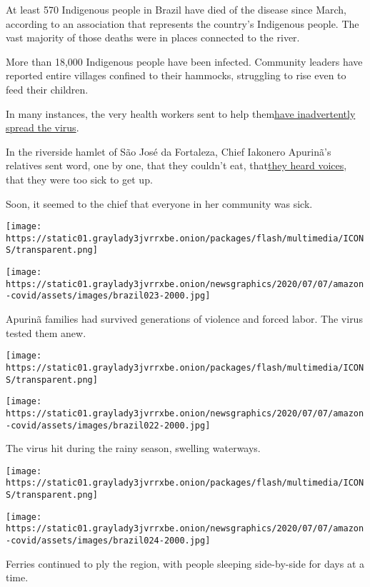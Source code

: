 At least 570 Indigenous people in Brazil have died of the disease since
March, according to an association that represents the country's
Indigenous people. The vast majority of those deaths were in places
connected to the river.

More than 18,000 Indigenous people have been infected. Community leaders
have reported entire villages confined to their hammocks, struggling to
rise even to feed their children.

In many instances, the very health workers sent to help
them\href{https://www.nytimes3xbfgragh.onion/2020/07/19/world/americas/coronavirus-brazil-indigenous.html}{}\href{https://www.nytimes3xbfgragh.onion/2020/07/19/world/americas/coronavirus-brazil-indigenous.html}{have
inadvertently spread the virus}.

In the riverside hamlet of São José da Fortaleza, Chief Iakonero
Apurinã's relatives sent word, one by one, that they couldn't eat,
that\href{https://www.nytimes3xbfgragh.onion/2020/06/28/health/coronavirus-delirium-hallucinations.html}{}\href{https://www.nytimes3xbfgragh.onion/2020/06/28/health/coronavirus-delirium-hallucinations.html}{they
heard voices}, that they were too sick to get up.

Soon, it seemed to the chief that everyone in her community was sick.

\texttt{[image: https://static01.graylady3jvrrxbe.onion/packages/flash/multimedia/ICONS/transparent.png]}

\texttt{[image: https://static01.graylady3jvrrxbe.onion/newsgraphics/2020/07/07/amazon-covid/assets/images/brazil023-2000.jpg]}

Apurinã families had survived generations of violence and forced labor.
The virus tested them anew.

\texttt{[image: https://static01.graylady3jvrrxbe.onion/packages/flash/multimedia/ICONS/transparent.png]}

\texttt{[image: https://static01.graylady3jvrrxbe.onion/newsgraphics/2020/07/07/amazon-covid/assets/images/brazil022-2000.jpg]}

The virus hit during the rainy season, swelling waterways.

\texttt{[image: https://static01.graylady3jvrrxbe.onion/packages/flash/multimedia/ICONS/transparent.png]}

\texttt{[image: https://static01.graylady3jvrrxbe.onion/newsgraphics/2020/07/07/amazon-covid/assets/images/brazil024-2000.jpg]}

Ferries continued to ply the region, with people sleeping side-by-side
for days at a time.

